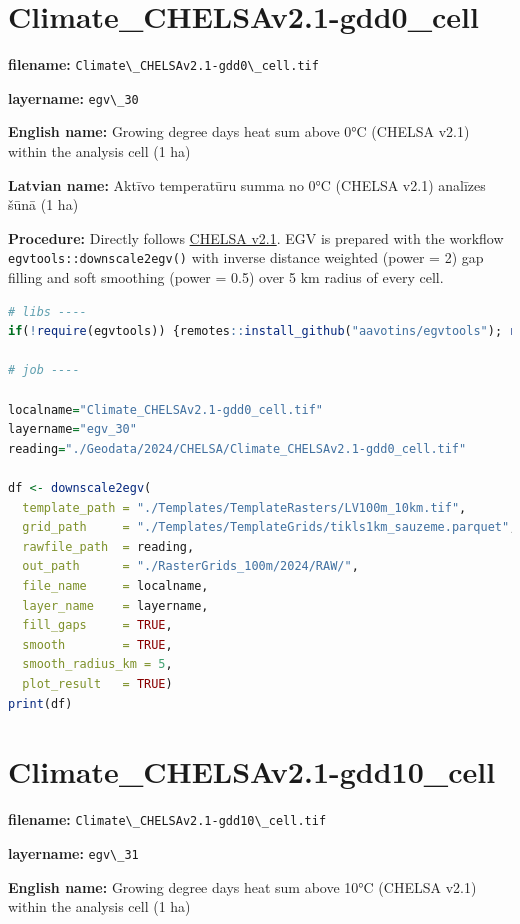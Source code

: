 \documentclass[
]{book}
\newcommand{\passthrough}[1]{#1}
\begin{document}
\section{Climate\_CHELSAv2.1-gdd0\_cell}\label{ch06.030}

\textbf{filename:} \passthrough{\lstinline!Climate\_CHELSAv2.1-gdd0\_cell.tif!}

\textbf{layername:} \passthrough{\lstinline!egv\_30!}

\textbf{English name:} Growing degree days heat sum above 0°C (CHELSA v2.1) within the analysis cell (1 ha)

\textbf{Latvian name:} Aktīvo temperatūru summa no 0°C (CHELSA v2.1) analīzes šūnā (1 ha)

\textbf{Procedure:} Directly follows \hyperref[Ch04.11]{CHELSA v2.1}. EGV is prepared with the
workflow \passthrough{\lstinline!egvtools::downscale2egv()!} with inverse distance weighted (power = 2)
gap filling and soft smoothing (power = 0.5) over 5 km radius of every cell.

\begin{lstlisting}[language=R]
# libs ----
if(!require(egvtools)) {remotes::install_github("aavotins/egvtools"); require(egvtools)}

# job ----

localname="Climate_CHELSAv2.1-gdd0_cell.tif"
layername="egv_30"
reading="./Geodata/2024/CHELSA/Climate_CHELSAv2.1-gdd0_cell.tif"

df <- downscale2egv(
  template_path = "./Templates/TemplateRasters/LV100m_10km.tif",
  grid_path     = "./Templates/TemplateGrids/tikls1km_sauzeme.parquet",
  rawfile_path  = reading,
  out_path      = "./RasterGrids_100m/2024/RAW/",
  file_name     = localname,
  layer_name    = layername,
  fill_gaps     = TRUE,
  smooth        = TRUE,
  smooth_radius_km = 5,
  plot_result   = TRUE)
print(df)
\end{lstlisting}

\section{Climate\_CHELSAv2.1-gdd10\_cell}\label{ch06.031}

\textbf{filename:} \passthrough{\lstinline!Climate\_CHELSAv2.1-gdd10\_cell.tif!}

\textbf{layername:} \passthrough{\lstinline!egv\_31!}

\textbf{English name:} Growing degree days heat sum above 10°C (CHELSA v2.1) within the analysis cell (1 ha)
\end{document}
